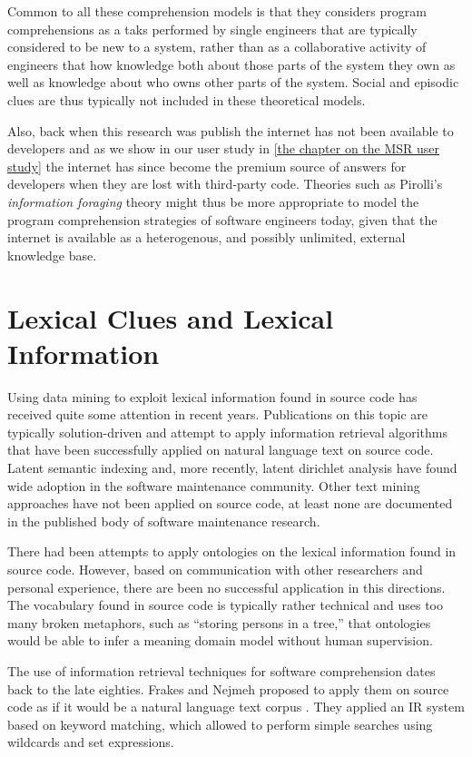 Common to all these comprehension models is that they considers program comprehensions as a taks performed by single engineers that are typically considered to be new to a system, rather than as a collaborative activity of engineers that how knowledge both about those parts of the system they own as well as knowledge about who owns other parts of the system. Social and episodic clues are thus typically not included in these theoretical models.

Also, back when this research was publish the internet has not been available to developers and as we show in our user study in \autoref{the chapter on the MSR user study} the internet has since become the premium source of answers for developers when they are lost with third-party code. Theories such as Pirolli's \emph{information foraging} theory \cite{InfoForage} might thus be more appropriate to model the program comprehension strategies of software engineers today, given that the internet is available as a heterogenous, and possibly unlimited, external knowledge base. 



\section{Lexical Clues and Lexical Information}

Using data mining to exploit lexical information found in source code has received quite some attention in recent years. Publications on this topic are typically solution-driven and attempt to apply information retrieval algorithms that have been successfully applied on natural language text on source code. Latent semantic indexing \cite{Deer90a} and, more recently, latent dirichlet analysis \cite{Bald08a} have found wide adoption in the software maintenance community. Other text mining approaches have not been applied on source code, at least none are documented in the published body of software maintenance research.

There had been attempts to apply ontologies on the lexical information found in source code. However, based on communication with other researchers and personal experience, there are been no successful application in this directions. The vocabulary found in source code is typically rather technical and uses too many broken metaphors, such as ``storing persons in a tree,'' that ontologies would be able to infer a meaning domain model without human supervision.

The use of information retrieval techniques for software comprehension dates back to the late eighties. Frakes and Nejmeh proposed to apply them on source code as if it would be a natural language text corpus \cite{Frak87a}. They applied an IR system based on keyword matching, which allowed to perform simple searches using wildcards and set expressions.


